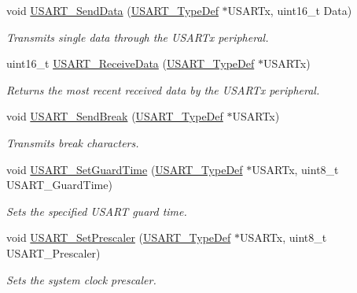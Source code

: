 \begin{DoxyCompactItemize}
void \hyperlink{group___u_s_a_r_t___private___functions_ga0b43d42da9540f446d494bf69823c6fb}{U\+S\+A\+R\+T\+\_\+\+Send\+Data} (\hyperlink{struct_u_s_a_r_t___type_def}{U\+S\+A\+R\+T\+\_\+\+Type\+Def} $\ast$U\+S\+A\+R\+Tx, uint16\+\_\+t Data)
\begin{DoxyCompactList}\small\item\em Transmits single data through the U\+S\+A\+R\+Tx peripheral. \end{DoxyCompactList}\item 
uint16\+\_\+t \hyperlink{group___u_s_a_r_t___private___functions_gac67a91845b0b1d54d31bdfb1c5e9867c}{U\+S\+A\+R\+T\+\_\+\+Receive\+Data} (\hyperlink{struct_u_s_a_r_t___type_def}{U\+S\+A\+R\+T\+\_\+\+Type\+Def} $\ast$U\+S\+A\+R\+Tx)
\begin{DoxyCompactList}\small\item\em Returns the most recent received data by the U\+S\+A\+R\+Tx peripheral. \end{DoxyCompactList}\item 
void \hyperlink{group___u_s_a_r_t___private___functions_ga39a3d33e23ee28529fa8f7259ce6811e}{U\+S\+A\+R\+T\+\_\+\+Send\+Break} (\hyperlink{struct_u_s_a_r_t___type_def}{U\+S\+A\+R\+T\+\_\+\+Type\+Def} $\ast$U\+S\+A\+R\+Tx)
\begin{DoxyCompactList}\small\item\em Transmits break characters. \end{DoxyCompactList}\item 
void \hyperlink{group___u_s_a_r_t___private___functions_gac4a35c6acd71ae7e0d67c1f03f0a8777}{U\+S\+A\+R\+T\+\_\+\+Set\+Guard\+Time} (\hyperlink{struct_u_s_a_r_t___type_def}{U\+S\+A\+R\+T\+\_\+\+Type\+Def} $\ast$U\+S\+A\+R\+Tx, uint8\+\_\+t U\+S\+A\+R\+T\+\_\+\+Guard\+Time)
\begin{DoxyCompactList}\small\item\em Sets the specified U\+S\+A\+RT guard time. \end{DoxyCompactList}\item 
void \hyperlink{group___u_s_a_r_t___private___functions_gaf5da8f2eee8245425584d85d4f62cc33}{U\+S\+A\+R\+T\+\_\+\+Set\+Prescaler} (\hyperlink{struct_u_s_a_r_t___type_def}{U\+S\+A\+R\+T\+\_\+\+Type\+Def} $\ast$U\+S\+A\+R\+Tx, uint8\+\_\+t U\+S\+A\+R\+T\+\_\+\+Prescaler)
\begin{DoxyCompactList}\small\item\em Sets the system clock prescaler. \end{DoxyCompactList}\item 

\end{DoxyCompactItemize}
